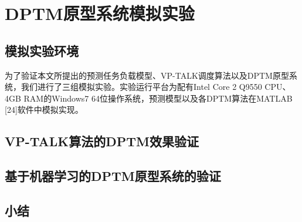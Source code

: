 


\chapter{DPTM原型系统模拟实验}
\label{cha:DPTMexperiments}

\section{模拟实验环境}
为了验证本文所提出的预测任务负载模型、VP-TALK调度算法以及DPTM原型系统，我们进行了三组模拟实验。实验运行平台为配有Intel Core 2 Q9550 CPU、4GB RAM的Windows7 64位操作系统，预测模型以及各DPTM算法在MATLAB [24]软件中模拟实现。

\section{VP-TALK算法的DPTM效果验证}


\section{基于机器学习的DPTM原型系统的验证}


\section{小结}


